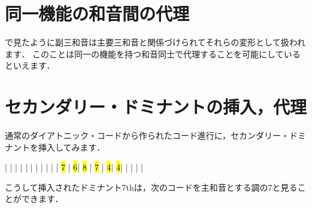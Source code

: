 \documentclass[dvipdfmx,uplatex,b5paper,openany,jbase=12Q,nomag*,textwidth-limit=44%
               ]{gachimuchi}
\begin{document}
\section{同一機能の和音間の代理}
で見たように副三和音は主要三和音と関係づけられてそれらの変形として扱われます．
このことは同一の機能を持つ和音同士で代理することを可能にしているといえます．

\section{セカンダリー・ドミナントの挿入，代理}
通常のダイアトニック・コードから作られたコード進行に，セカンダリー・ドミナントを挿入してみます．

\begin{Music}
  \generalmeter{\meterC}%
  \Startpiece%
  \NOTEs%
  |%
  \en%
  \bar%
  \NOTEs%
  |%
  \en%
  \bar%
  \NOTEs%
  |%
  \en%
  \bar%
  \NOTEs%
  |%
  \en%
  \bar%
  \NOTEs%
  |%
  \en%
  \setdoubleBAR\endpiece
  \generalmeter{\meterC}%
  \Startpiece%
  \NOTes%
  |%
  \en%
  \NOTes%
  |%
  \hl{7}\en%
  \bar%
  \NOTes%
  \hl{6}|%
  \hl{8}\en%
  \NOTes%
  |%
  \hl{7}\en%
  \bar%
  \NOTes%
  \hl{4}|%
  \en%
  \NOTes%
  \hl{4}|%
  \en%
  \bar%
  \NOTEs%
  |%
  \en%
  \bar%
  \NOTEs%
  |%
  \en%
  \setdoubleBAR\endpiece
\end{Music}

こうして挿入されたドミナント7thは，次のコードを主和音とする調の\Gnv\subsc7と見ることができます．
\end{document}
